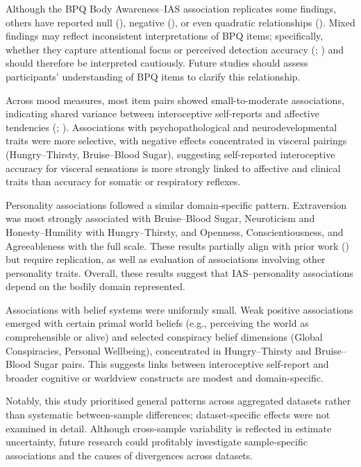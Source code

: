 \documentclass[
  jou,
  floatsintext,
  longtable,
  nolmodern,
  notxfonts,
  notimes,
  colorlinks=true,linkcolor=blue,citecolor=blue,urlcolor=blue]{apa7}
\begin{document}
Although the BPQ Body Awareness--IAS association replicates some
findings, others have reported null (), negative (), or
even quadratic relationships (). Mixed findings may reflect inconsistent interpretations of BPQ
items; specifically, whether they capture attentional focus or perceived
detection accuracy (;
) and
should therefore be interpreted cautiously. Future studies should assess
participants' understanding of BPQ items to clarify this relationship.

Across mood measures, most item pairs showed small-to-moderate
associations, indicating shared variance between interoceptive
self-reports and affective tendencies (; ).
Associations with psychopathological and neurodevelopmental traits were
more selective, with negative effects concentrated in visceral pairings
(Hungry--Thirsty, Bruise--Blood Sugar), suggesting self-reported
interoceptive accuracy for visceral sensations is more strongly linked
to affective and clinical traits than accuracy for somatic or
respiratory reflexes.

Personality associations followed a similar domain-specific pattern.
Extraversion was most strongly associated with Bruise--Blood Sugar,
Neuroticism and Honesty--Humility with Hungry--Thirsty, and Openness,
Conscientiousness, and Agreeableness with the full scale. These results
partially align with prior work () but require replication, as well as evaluation of associations
involving other personality traits. Overall, these results suggest that
IAS--personality associations depend on the bodily domain represented.

Associations with belief systems were uniformly small. Weak positive
associations emerged with certain primal world beliefs (e.g., perceiving
the world as comprehensible or alive) and selected conspiracy belief
dimensions (Global Conspiracies, Personal Wellbeing), concentrated in
Hungry--Thirsty and Bruise--Blood Sugar pairs. This suggests links
between interoceptive self-report and broader cognitive or worldview
constructs are modest and domain-specific.

Notably, this study prioritised general patterns across aggregated
datasets rather than systematic between-sample differences;
dataset-specific effects were not examined in detail. Although
cross-sample variability is reflected in estimate uncertainty, future
research could profitably investigate sample-specific associations and
the causes of divergences across datasets.
\end{document}
